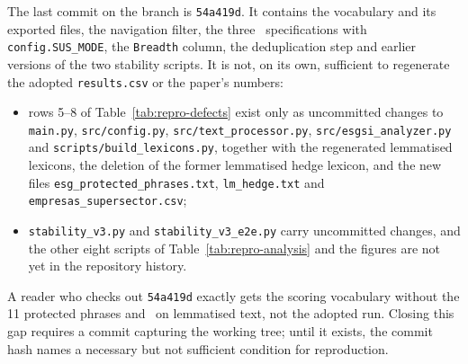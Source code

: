 The last commit on the branch is \texttt{54a419d}. It contains the
vocabulary and its exported files, the navigation filter, the three \SUS\
specifications with \texttt{config.SUS\_MODE}, the \texttt{Breadth} column,
the deduplication step and earlier versions of the two stability scripts. It
is not, on its own, sufficient to regenerate the adopted \texttt{results.csv}
or the paper's numbers:
\begin{itemize}
  \item rows 5--8 of Table~\ref{tab:repro-defects} exist only as uncommitted
        changes to \nolinkurl{main.py}, \nolinkurl{src/config.py},
        \nolinkurl{src/text_processor.py}, \nolinkurl{src/esgsi_analyzer.py}
        and \nolinkurl{scripts/build_lexicons.py}, together with the
        regenerated lemmatised lexicons, the deletion of the former lemmatised
        hedge lexicon, and the new files \nolinkurl{esg_protected_phrases.txt},
        \nolinkurl{lm_hedge.txt} and \nolinkurl{empresas_supersector.csv};
  \item \nolinkurl{stability_v3.py} and \nolinkurl{stability_v3_e2e.py} carry
        uncommitted changes, and the other eight scripts of
        Table~\ref{tab:repro-analysis} and the figures are not yet in the
        repository history.
\end{itemize}
A reader who checks out \texttt{54a419d} exactly gets the scoring vocabulary
without the 11 protected phrases and \HEDGE\ on lemmatised text, not the
adopted run. Closing this gap requires a commit capturing the working tree;
until it exists, the commit hash names a necessary but not sufficient
condition for reproduction.

\endgroup
